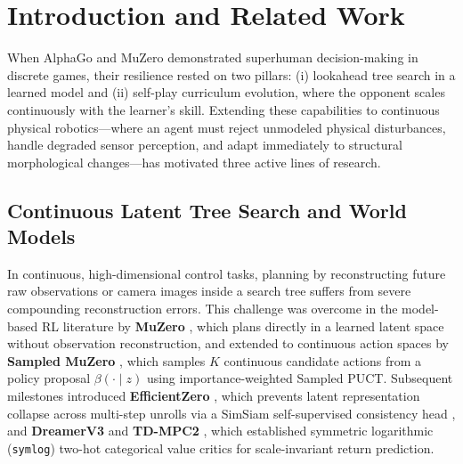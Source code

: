 \documentclass[11pt,a4paper]{article}
\begin{document}
\vspace{1em}

\section{Introduction and Related Work}

When AlphaGo \cite{silver2016mastering,silver2017mastering} and MuZero \cite{schrittwieser2020mastering} demonstrated superhuman decision-making in discrete games, their resilience rested on two pillars: (i) lookahead tree search in a learned model and (ii) self-play curriculum evolution, where the opponent scales continuously with the learner's skill. Extending these capabilities to continuous physical robotics—where an agent must reject unmodeled physical disturbances, handle degraded sensor perception, and adapt immediately to structural morphological changes—has motivated three active lines of research.

\subsection{Continuous Latent Tree Search and World Models}
In continuous, high-dimensional control tasks, planning by reconstructing future raw observations or camera images inside a search tree suffers from severe compounding reconstruction errors. This challenge was overcome in the model-based RL literature by \textbf{MuZero} \cite{schrittwieser2020mastering}, which plans directly in a learned latent space without observation reconstruction, and extended to continuous action spaces by \textbf{Sampled MuZero} \cite{hubert2021learning}, which samples $K$ continuous candidate actions from a policy proposal $\beta(\cdot \mid z)$ using importance-weighted Sampled PUCT. Subsequent milestones introduced \textbf{EfficientZero} \cite{ye2021mastering}, which prevents latent representation collapse across multi-step unrolls via a SimSiam self-supervised consistency head \cite{chen2021exploring}, and \textbf{DreamerV3} \cite{hafner2023mastering} and \textbf{TD-MPC2} \cite{hansen2024tdmpc2}, which established symmetric logarithmic (\texttt{symlog}) two-hot categorical value critics for scale-invariant return prediction.
\end{document}
